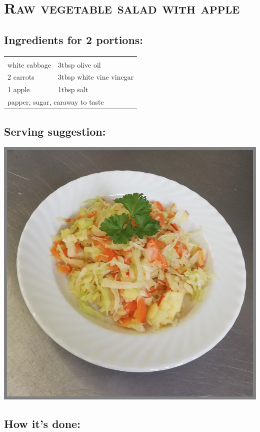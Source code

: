 \section{\textsc{Raw vegetable salad with apple}}

\subsection*{Ingredients for 2 portions:}

\begin{tabular}{p{7.5cm} p{7.5cm}}
	& \\
	\sfrac{1}{2} white cabbage & 3tbsp olive oil \\
	2 carrots & 3tbsp white vine vinegar \\
	1 apple & 1tbsp salt \\
	\multicolumn{2}{l}{papper, sugar, caraway to taste}
\end{tabular}

\subsection*{Serving suggestion:}

\includegraphics[width=\textwidth]{img/krautsalat_apfel.jpg} \cite{rohkostapfel}

\subsection*{How it's done:}

